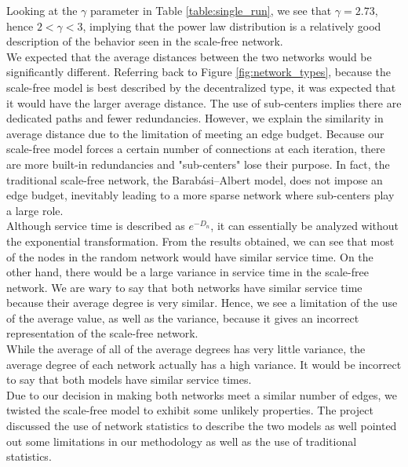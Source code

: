 \documentclass[journal]{IEEEtran}
\begin{document}
\noindent Looking at the $\gamma$ parameter in Table \ref{table:single_run}, we see that $\gamma = 2.73$, hence $2 < \gamma < 3$, implying that the power law distribution is a relatively good description of the behavior seen in the scale-free network.\\

\noindent We expected that the average distances between the two networks would be significantly different. Referring back to Figure \ref{fig:network_types}, because the scale-free model is best described by the decentralized type, it was expected that it would have the larger average distance. The use of sub-centers implies there are dedicated paths and fewer redundancies. However, we explain the similarity in average distance due to the limitation of meeting an edge budget. Because our scale-free model forces a certain number of connections at each iteration, there are more built-in redundancies and "sub-centers" lose their purpose. In fact, the traditional scale-free network, the Barabási–Albert model, does not impose an edge budget, inevitably leading to a more sparse network where sub-centers play a large role. \\

\noindent Although service time is described as $e^{-D_n}$, it can essentially be analyzed without the exponential transformation. From the results obtained, we can see that most of the nodes in the random network would have similar service time. On the other hand, there would be a large variance in service time in the scale-free network. We are wary to say that both networks have similar service time because their average degree is very similar. Hence, we see a limitation of the use of the average value, as well as the variance, because it gives an incorrect representation of the scale-free network. \\


\noindent While the average of all of the average degrees has very little variance, the average degree of each network actually has a high variance. It would be incorrect to say that both models have similar service times. \\

\noindent Due to our decision in making both networks meet a similar number of edges, we twisted the scale-free model to exhibit some unlikely properties. The project discussed the use of network statistics to describe the two models as well pointed out some limitations in our methodology as well as the use of traditional statistics.
\end{document}
